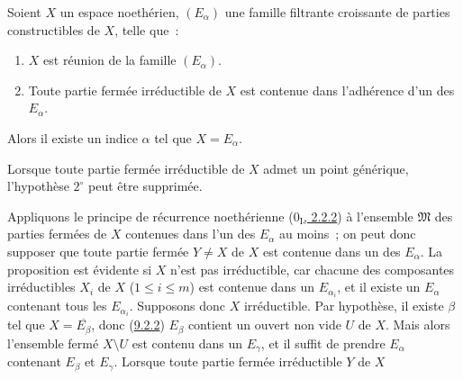 \begin{corollary}[9.2.4]
\label{0.9.2.4-fr}
Soient $X$ un espace noethérien, $(E_\alpha)$ une famille filtrante
croissante de parties constructibles de $X$, telle que~:
\begin{enumerate}
  \item[$1^\circ$] $X$ est réunion de la famille $(E_\alpha)$.
  \item[$2^\circ$] Toute partie fermée irréductible de $X$ est contenue dans
    l'adhérence d'un des $E_\alpha$.
\end{enumerate}
Alors il existe un indice $\alpha$ tel que $X=E_\alpha$.

Lorsque toute partie fermée irréductible de $X$ admet un point générique,
l'hypothèse $2^\circ$ peut être supprimée.
\end{corollary}

Appliquons le principe de récurrence noethérienne
(\hyperref[0.2.2.2-fr]{$0_{\mathrm I}$, 2.2.2}) à l'ensemble
$\mathfrak{M}$ des parties fermées de $X$ contenues dans l'un des $E_\alpha$
au moins~; on peut donc supposer que toute partie fermée $Y\ne X$ de $X$ est
contenue dans un des $E_\alpha$. La proposition est évidente si $X$ n'est pas
irréductible, car chacune des composantes irréductibles $X_i$ de $X$
($1\leq i\leq m$) est contenue dans un $E_{\alpha_i}$, et il existe un
$E_\alpha$ contenant tous les $E_{\alpha_i}$. Supposons donc $X$
irréductible. Par hypothèse, il existe $\beta$ tel que
$X=\overline{E_\beta}$, donc (\hyperref[0.9.2.2-fr]{9.2.2}) $E_\beta$
contient un ouvert non vide $U$ de $X$. Mais alors l'ensemble fermé
$X\setminus U$ est contenu dans un $E_\gamma$, et il suffit de prendre
$E_\alpha$ contenant $E_\beta$ et $E_\gamma$. Lorsque toute partie fermée
irréductible $Y$ de $X$
